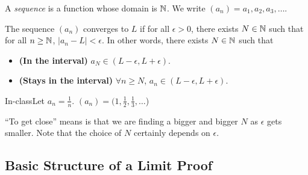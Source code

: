 \begin{definition}
    A \textit{sequence} is a function whose domain is $\mathbb{N}$. We write $(a_n) = a_1,a_2,a_3,\dots$.
\end{definition}
\setcounter{BoxCounter}{2}
\begin{definition}
    The sequence $(a_n)$ converges to $L$ if for all $\epsilon > 0$, there exists $N \in \mathbb{N}$ such that for all $n \geq \mathbb{N}$, $|a_n - L| < \epsilon$. In other words, there exists $N \in \mathbb{N}$ such that
    \begin{itemize}
        \item \textbf{(In the interval)} $a_N \in (L - \epsilon, L + \epsilon)$.
        \item \textbf{(Stays in the interval)} $\forall n \geq N$, $a_n \in (L - \epsilon, L + \epsilon)$.
    \end{itemize}
\end{definition}

\begin{example}
    {In-class}Let $a_n = \frac{1}{n}$. $(a_n) = (1,\frac{1}{2},\frac{1}{3},\dots$)
\end{example}


``To get close'' means is that we are finding a bigger and bigger $N$ as $\epsilon$ gets smaller. Note that the choice of $N$ certainly depends on $\epsilon$.

\subsection{Basic Structure of a Limit Proof}

